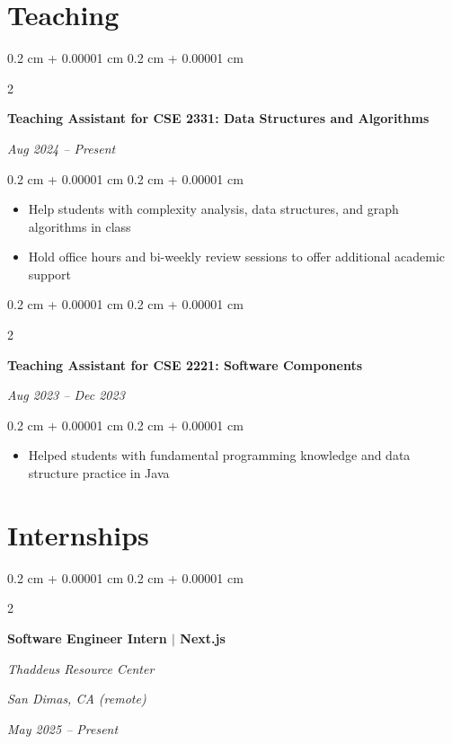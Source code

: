 \documentclass[10pt, letterpaper]{article}
\newenvironment{highlights}{
    \begin{itemize}[
        topsep=0.10 cm,
        parsep=0.10 cm,
        partopsep=0pt,
        itemsep=0pt,
        leftmargin=0.4 cm + 10pt
    ]
}{
    \end{itemize}
} %
\newenvironment{onecolentry}{
    \begin{adjustwidth}{
        0.2 cm + 0.00001 cm
    }{
        0.2 cm + 0.00001 cm
    }
}{
    \end{adjustwidth}
} %
\newenvironment{twocolentry}[2][]{
    \onecolentry
    \def\secondColumn{#2}
    \setcolumnwidth{\fill, 4.5 cm}
    \begin{paracol}{2}
}{
    \switchcolumn \raggedleft \secondColumn
    \end{paracol}
    \endonecolentry
} %
\begin{document}
    \section{Teaching}
    \begin{twocolentry}{
        \textit{Aug 2024 – Present}}
        \textbf{Teaching Assistant for CSE 2331: Data Structures and Algorithms}
        \end{twocolentry}
        \vspace{0.10 cm}
        \begin{onecolentry}
            \begin{highlights}
                \item Help students with complexity analysis, data structures, and graph algorithms in class
                \item Hold office hours and bi-weekly review sessions to offer additional academic support 
            \end{highlights}
        \end{onecolentry}
        \vspace{0.1 cm}
        \begin{twocolentry}{
        \textit{Aug 2023 – Dec 2023}}
            \textbf{Teaching Assistant for CSE 2221: Software Components}
        \end{twocolentry}

        \vspace{0.10 cm}
        \begin{onecolentry}
            \begin{highlights}
                \item Helped students with fundamental programming knowledge and data structure practice in Java 
            \end{highlights}
        \end{onecolentry}

    \section{Internships}
        \begin{twocolentry}{
        \textit{San Dimas, CA (remote)}    
            
        \textit{May 2025 – Present}}
            \textbf{Software Engineer Intern $|$ Next.js}
            
            \textit{Thaddeus Resource Center}
        \end{twocolentry}
\end{document}
